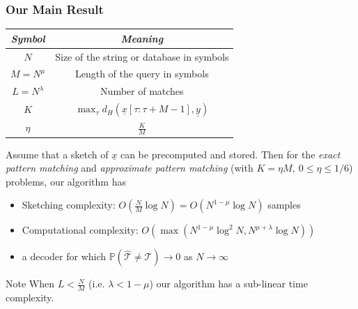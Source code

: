 \documentclass[10pt,xcolor=table]{beamer}
\newcommand{\mbb}{\mathbb}
\newcommand{\xv}{\underline{x}}
\newcommand{\yv}{\underline{y}}
\begin{document}
	 \begin{frame} \frametitle{Our Main Result}

	{\small
	\begin{table}[h!]
		\begin{center}
			\begin{tabular}{|c|c|} 	
				\hline		
				\textit{Symbol}		&  \textit{Meaning} \\		
				\hline
				$N$           		& Size of the string or database in symbols \\
				\hline
				$M = N^{\mu}$       & Length of the query in symbols \\
				\hline
				$L = N^\lambda$    &   Number of matches \\
				\hline
				$K$             &$\max_{\tau}d_{H}(\xv[\tau:\tau+M-1],\yv)$\\
				\hline
				$\eta$             &$\frac{K}{M}$\\
				\hline
			\end{tabular}
		\end{center}
	\end{table}
    }	
     	
    \vspace{-2.5mm}
	 \begin{theorem}
	 	Assume that a sketch of $\xv$ can be precomputed and stored. Then for the {\it exact pattern matching} and {\it approximate pattern matching} (with $K = \eta M,~ 0 \leq \eta \leq 1/6$) problems, our algorithm has
	 	\begin{itemize}
	 		\item \alert{Sketching complexity:} {\color{blue} $O(\frac{N}{M}\log N)=O(N^{1-\mu}\log N)$} \alert{samples}
	 		\item \alert{Computational complexity:}
	 		{\color{blue}$O(\max(N^{1-\mu}\log^2 N, N^{\mu+\lambda}\log N ))$}	 		
	 		\item a decoder for which $\mbb{P}(\hat{{\mathcal{T}}} \neq \mathcal{T}) \rightarrow 0$ as $N \rightarrow \infty$
	 	\end{itemize}
	 \end{theorem}
	 \pause
	 \vspace{-0.5mm}
	 \begin{block}{\alert{Note}}
	 	When $L<\frac{N}{M}$ (i.e. $\lambda<1-\mu$) our algorithm has a {\color{blue}sub-linear time} complexity.
	 \end{block}	
\end{frame}
\end{document}
